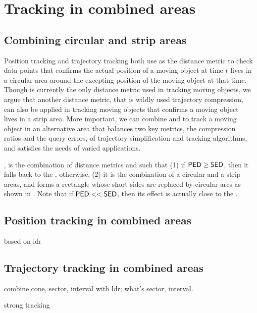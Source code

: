 

\section{Tracking in combined areas}
\label{sec:combine}


\subsection{Combining circular and strip areas}
Position tracking and trajectory tracking both use \sed as the distance metric to check data points that confirms the actual position of a moving object at time $t$ lives in a circular area around the excepting position of the moving object at that time.
Though \sed is currently the only distance metric used in tracking moving objects, we argue that another distance metric, \ped that is wildly used trajectory compression, can also be applied in tracking moving objects that confirms a moving object lives in a strip area. More important, we can combine \sed and \ped to track a moving object in an alternative area that balances two key metrics, \ie the compression ratios and the query errors, of trajectory simplification and tracking algorithms, and satisfies the needs of varied applications.


, is the combination of distance metrics \sed and \ped such that (1) if ${\mathsf{PED}} \ge {\ensuremath {\mathsf{SED}}}$, then it falls back to the \sed, otherwise, (2) it is the combination of a circular and a strip areas, and forms a rectangle whose short sides are replaced by circular arcs as shown in . Note that if ${\mathsf{PED}} << {\mathsf{SED}}$, then its effect is actually close to the \ped.



\subsection{Position tracking in combined areas}
based on ldr


\subsection{Trajectory tracking in combined areas}

combine cone, sector, interval with ldr; what's sector, interval.


strong tracking

